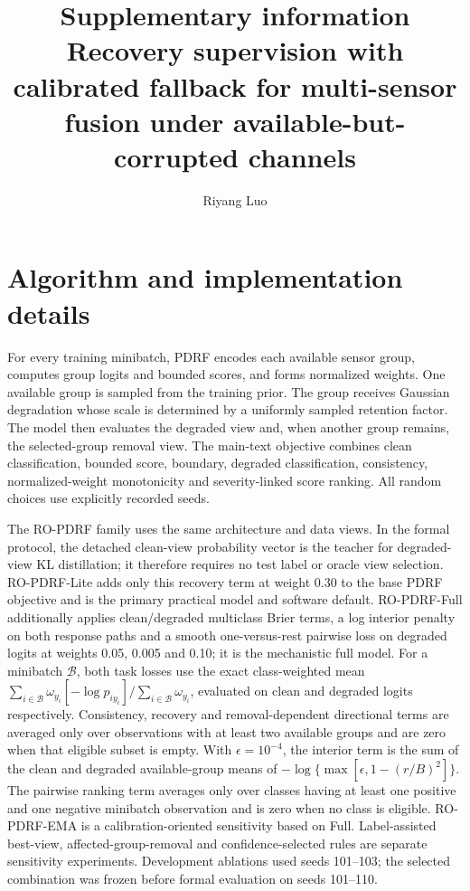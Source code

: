 \documentclass[10pt]{article}
\title{Supplementary information\\Recovery supervision with calibrated fallback for multi-sensor fusion under available-but-corrupted channels}
\author{Riyang Luo}
\date{}
\begin{document}
\maketitle

\section{Algorithm and implementation details}

For every training minibatch, PDRF encodes each available sensor group, computes group logits and bounded scores, and forms normalized weights. One available group is sampled from the training prior. The group receives Gaussian degradation whose scale is determined by a uniformly sampled retention factor. The model then evaluates the degraded view and, when another group remains, the selected-group removal view. The main-text objective combines clean classification, bounded score, boundary, degraded classification, consistency, normalized-weight monotonicity and severity-linked score ranking. All random choices use explicitly recorded seeds.

The RO-PDRF family uses the same architecture and data views. In the formal protocol, the detached clean-view probability vector is the teacher for degraded-view KL distillation; it therefore requires no test label or oracle view selection. RO-PDRF-Lite adds only this recovery term at weight 0.30 to the base PDRF objective and is the primary practical model and software default. RO-PDRF-Full additionally applies clean/degraded multiclass Brier terms, a log interior penalty on both response paths and a smooth one-versus-rest pairwise loss on degraded logits at weights 0.05, 0.005 and 0.10; it is the mechanistic full model. For a minibatch $\mathcal B$, both task losses use the exact class-weighted mean $\sum_{i\in\mathcal B}\omega_{y_i}[-\log p_{iy_i}]/\sum_{i\in\mathcal B}\omega_{y_i}$, evaluated on clean and degraded logits respectively. Consistency, recovery and removal-dependent directional terms are averaged only over observations with at least two available groups and are zero when that eligible subset is empty. With $\epsilon=10^{-4}$, the interior term is the sum of the clean and degraded available-group means of $-\log\{\max[\epsilon,1-(r/B)^2]\}$. The pairwise ranking term averages only over classes having at least one positive and one negative minibatch observation and is zero when no class is eligible. RO-PDRF-EMA is a calibration-oriented sensitivity based on Full. Label-assisted best-view, affected-group-removal and confidence-selected rules are separate sensitivity experiments. Development ablations used seeds 101--103; the selected combination was frozen before formal evaluation on seeds 101--110.
\end{document}
